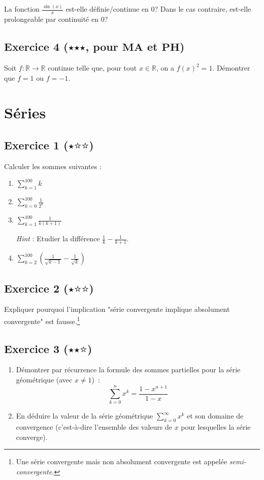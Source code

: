 \documentclass{article}
\begin{document}
\noindent La fonction $\displaystyle\frac{\sin(x)}{x}$ est-elle définie/continue en $0$? Dans le cas contraire, est-elle prolongeable par continuité en $0$?


\subsection*{Exercice 4 ($\medblackstar \medblackstar \medblackstar$, pour $\textbf{MA}$ et $\textbf{PH}$) }%
\noindent Soit $f:\mathbb{R} \to \mathbb{R}$ continue telle que, pour tout $x \in \mathbb{R}$, on a $f(x)^{2}=1$. Démontrer que $f=1$ ou $f=-1$.

\section{Séries}
\subsection*{Exercice 1 ($\medblackstar \medwhitestar \medwhitestar$)}
Calculer les sommes suivantes :
\begin{enumerate}
    \item $\displaystyle\sum_{k=1}^{100} k$
    \item $\displaystyle\sum_{k=0}^{100} \frac{1}{2^{k}}$
    \item $\displaystyle\sum_{k=1}^{100} \frac{1}{k(k+1)}$

    \textit{Hint} : Etudier la différence $\frac{1}{k}-\frac{1}{k+1}$.

    \item $\displaystyle\sum_{k=2}^{100} \left(\frac{1}{\sqrt{k-1}}-\frac{1}{\sqrt{k}}\right)$
\end{enumerate}

\subsection*{Exercice 2 ($\medblackstar \medwhitestar \medwhitestar$)}
Expliquer pourquoi l'implication "série convergente implique absolument convergente" est fausse.\footnote{Une série convergente mais non absolument convergente est appelée \emph{semi-convergente}.}

\subsection*{Exercice 3 ($\medblackstar \medblackstar \medwhitestar$)}
\begin{enumerate}
    \item Démontrer par récurrence la formule des sommes partielles pour la série géométrique (avec $x \neq 1$)~:
    \[
    \sum_{k = 0}^{n} x^k = \frac{1 - x^{n+1}}{1 - x}
    \]
    \item En déduire la valeur de la série géométrique $\displaystyle\sum_{k = 0}^{\infty} x^k$ et son domaine de convergence (c'est-à-dire l'ensemble des valeurs de $x$ pour lesquelles la série converge).
\end{enumerate}
\end{document}

